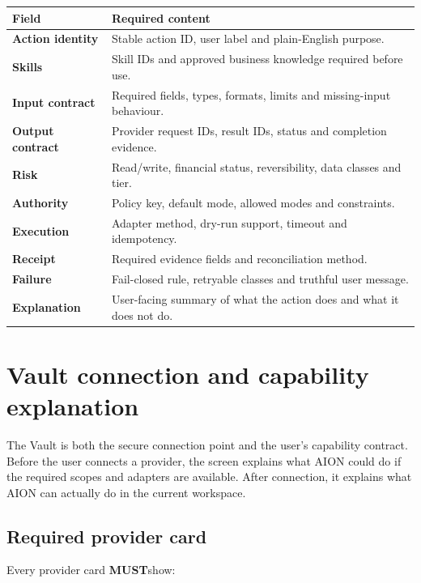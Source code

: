 \documentclass[11pt,a4paper]{article}
\newcommand{\must}{\textbf{MUST}}
\begin{document}
\begin{longtable}{>{\bfseries}p{34mm}p{118mm}}
\toprule
Field & Required content \\
\midrule
Action identity & Stable action ID, user label and plain-English purpose. \\
Skills & Skill IDs and approved business knowledge required before use. \\
Input contract & Required fields, types, formats, limits and missing-input behaviour. \\
Output contract & Provider request IDs, result IDs, status and completion evidence. \\
Risk & Read/write, financial status, reversibility, data classes and tier. \\
Authority & Policy key, default mode, allowed modes and constraints. \\
Execution & Adapter method, dry-run support, timeout and idempotency. \\
Receipt & Required evidence fields and reconciliation method. \\
Failure & Fail-closed rule, retryable classes and truthful user message. \\
Explanation & User-facing summary of what the action does and what it does not do. \\
\bottomrule
\end{longtable}

\section{Vault connection and capability explanation}
\label{sec:vault}

The Vault is both the secure connection point and the user's capability
contract. Before the user connects a provider, the screen explains what AION
could do if the required scopes and adapters are available. After connection,
it explains what AION can actually do in the current workspace.

\subsection{Required provider card}

Every provider card \must show:
\end{document}
